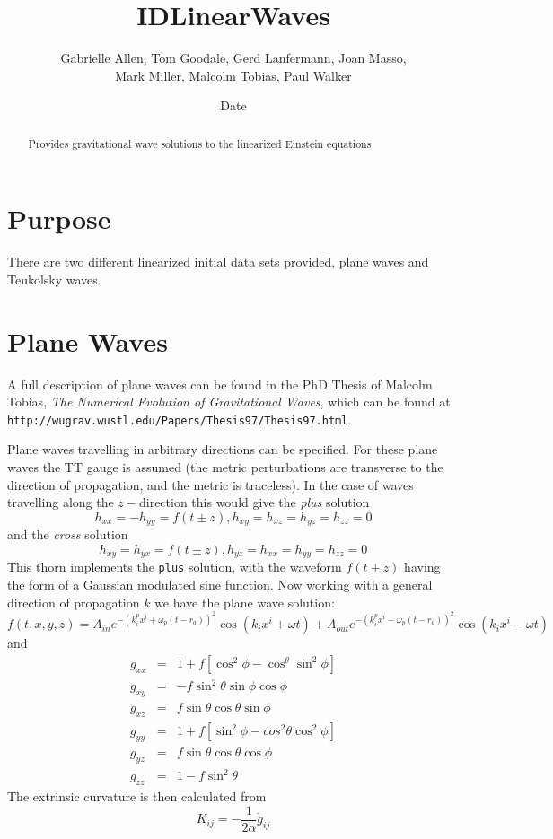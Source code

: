 \documentclass{article}
\begin{document}
\title{IDLinearWaves}
\author{Gabrielle Allen, Tom Goodale, Gerd Lanfermann, Joan Masso, \\ Mark Miller, Malcolm Tobias, Paul Walker}
\date{$ $Date$ $}

\maketitle


\begin{abstract}
Provides gravitational wave solutions to the linearized Einstein equations
\end{abstract}

\section{Purpose}

There are two different linearized initial data sets provided, plane waves 
and Teukolsky waves.

\section{Plane Waves}

A full description of plane waves can be found in the PhD Thesis of 
Malcolm Tobias, {\it The Numerical Evolution of Gravitational Waves}, 
which can be found at {\tt http://wugrav.wustl.edu/Papers/Thesis97/Thesis97.html}.

Plane waves travelling in arbitrary directions can be specified.  For
these plane waves the TT gauge is assumed (the metric perturbations
are transverse to the direction of propagation, and the metric is
traceless). In the case of waves travelling along the $z-$direction
this would give the {\it plus} solution
$$
h_{xx}=-h_{yy}=f(t\pm z), h_{xy}=h_{xz}=h_{yz}=h_{zz} = 0
$$
and the {\it cross} solution
$$
h_{xy}=h_{yx}=f(t\pm z), h_{yz}=h_{xx}=h_{yy}=h_{zz}=0
$$
This thorn implements the {\tt plus} solution, with the waveform
$f(t\pm z)$ having the form of a Gaussian modulated sine function. 
Now working with a general direction of propagation $k$ we have the
plane wave solution:
$$
f(t,x,y,z) = A_{in} e^{-(k_i^p x^i + \omega_p(t-r_a) )^2} \cos(k_ix^i+\omega t)
     + A_{out} e^{-(k_i^p x^i -\omega_p(t-r_a))^2} \cos(k_i x^i - \omega t)
$$
and
\begin{eqnarray*}
g_{xx}&=& 1 + f[\cos^2\phi - \cos^\theta\sin^2\phi]
\\
g_{xy}&=& - f \sin^2 \theta \sin \phi \cos \phi
\\
g_{xz} &=& f \sin\theta \cos\theta \sin\phi
\\
g_{yy} &=& 1+f [\sin^2\phi - cos^2\theta \cos^2\phi]
\\
g_{yz} &=& f \sin\theta \cos\theta \cos\phi
\\
g_{zz} &=& 1-f\sin^2\theta
\end{eqnarray*}
The extrinsic curvature is then calculated from 
\begin{equation}
K_{ij} = - \frac{1}{2\alpha} \dot{g}_{ij}
\end{equation}
\end{document}
